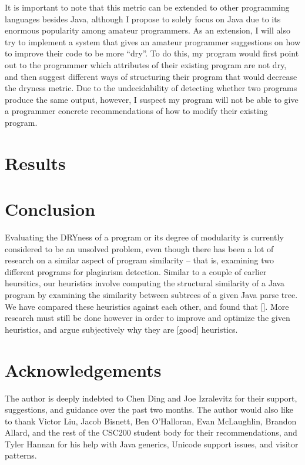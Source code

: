 \documentclass{article}
\begin{document}
It is important to note that this metric can be extended to other programming languages besides Java, although I propose to solely focus on Java due to its enormous popularity among amateur programmers. As an extension, I will also try to implement a system that gives an amateur programmer suggestions on how to improve their code to be more ``dry''. To do this, my program would first point out to the programmer which attributes of their existing program are not dry, and then suggest different ways of structuring their program that would decrease the dryness metric. Due to the undecidability of detecting whether two programs produce the same output, however, I suspect my program will not be able to give a programmer concrete recommendations of how to modify their existing program.

\section{Results}

\section{Conclusion}

Evaluating the DRYness of a program or its degree of modularity is currently considered to be an unsolved problem,
even though there has been a lot of research on a similar aspect of program similarity -- that is, examining two
different programs for plagiarism detection. Similar to a couple of earlier heursitics, our heuristics involve
computing the structural similarity of a Java program by examining the similarity between subtrees of a given Java parse tree. 
We have compared these heuristics against each other, and found that []. More research must still be done however in order to
improve and optimize the given heuristics, and argue subjectively why they are [good] heuristics.

\section{Acknowledgements}

The author is deeply indebted to Chen Ding and Joe Izralevitz for their support, suggestions, and guidance over the past two months.
The author would also like to thank Victor Liu, Jacob Bisnett, Ben O'Halloran, Evan McLaughlin, Brandon Allard, and the rest of
the CSC200 student body for their recommendations, and Tyler Hannan for his help with Java generics, Unicode support issues, and
visitor patterns.



\pagebreak
\pagestyle{empty}



\end{document}

